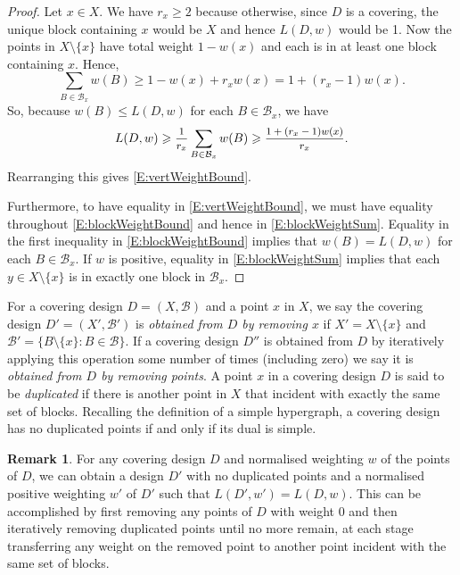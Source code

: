 \documentclass[11pt]{article}
\theoremstyle{definition}
\newtheorem{Remark}[Theorem]{Remark}
\renewcommand{\leq}{\leqslant}
\renewcommand{\geq}{\geqslant}
\newcommand{\B}{{\ensuremath{\mathcal{B}}}}
\begin{document}
\begin{proof}
Let $x \in X$. We have $r_x \geq 2$ because otherwise, since $D$ is a covering, the unique block containing $x$ would be $X$ and hence $L(D,w)$ would be 1. Now the points in $X \setminus \{x\}$ have total weight $1-w(x)$ and each is in at least one block containing $x$. Hence,
\begin{equation}\label{E:blockWeightSum}
\sum_{B \in \B_x}w(B) \geq 1-w(x)+r_xw(x) = 1+(r_x-1)w(x).
\end{equation}
So, because $w(B) \leq L(D,w)$ for each $B \in \B_x$, we have
\begin{equation}\label{E:blockWeightBound}
L(D,w) \geq \mfrac{1}{r_x}\sum_{B \in \B_x}w(B) \geq \mfrac{1+(r_x-1)w(x)}{r_x}.
\end{equation}
Rearranging this gives \eqref{E:vertWeightBound}.

Furthermore, to have equality in \eqref{E:vertWeightBound}, we must have equality throughout \eqref{E:blockWeightBound} and hence in \eqref{E:blockWeightSum}. Equality in the first inequality in \eqref{E:blockWeightBound} implies that $w(B)=L(D,w)$ for each $B \in \B_x$. If $w$ is positive, equality in \eqref{E:blockWeightSum} implies that each $y \in X \setminus \{x\}$ is in exactly one block in $\B_x$.
\end{proof}

For a covering design $D=(X,\B)$ and a point $x$ in $X$, we say the covering design $D'=(X',\B')$ is \emph{obtained from $D$ by removing $x$} if $X'=X \setminus \{x\}$ and $\B'=\{B \setminus \{x\}: B \in \B\}$. If a covering design $D''$ is obtained from $D$ by iteratively applying this operation some number of times (including zero) we say it is \emph{obtained from $D$ by removing points}. A point $x$ in a covering design $D$ is said to be \emph{duplicated} if there is another point in $X$ that incident with exactly the same set of blocks. Recalling the definition of a simple hypergraph, a covering design has no duplicated points if and only if its dual is simple.

\begin{Remark}\label{R:removing}
For any covering design $D$ and normalised weighting $w$ of the points of $D$, we can obtain a design $D'$ with no duplicated points and a normalised positive weighting $w'$ of $D'$ such that $L(D',w')=L(D,w)$. This can be accomplished by first removing any points of $D$ with weight 0 and then iteratively removing duplicated points until no more remain, at each stage transferring any weight on the removed point to another point incident with the same set of blocks.
\end{Remark}
\end{document}
